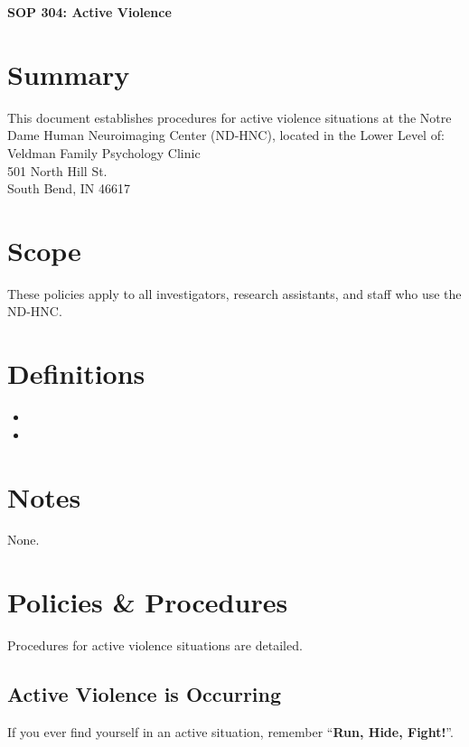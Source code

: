 \documentclass[11pt]{article}
\begin{document}
\renewcommand{\labelenumii}{\arabic{enumi}.\arabic{enumii}}
\renewcommand{\labelenumiii}{\arabic{enumi}.\arabic{enumii}.\arabic{enumiii}}
\renewcommand{\labelenumiv}{\arabic{enumi}.\arabic{enumii}.\arabic{enumiii}.\arabic{enumiv}}

\begin{center}
	\textbf{\Large SOP 304: Active Violence}\\
	\hrulefill
\end{center}


\section{Summary}
This document establishes  procedures for active violence situations at the Notre Dame Human Neuroimaging Center (ND-HNC), located in the Lower Level of:\\

Veldman Family Psychology Clinic\\
501 North Hill St.\\
South Bend, IN 46617

\section{Scope}
These policies apply to all investigators, research assistants, and staff who use the ND-HNC.

\section{Definitions}

\begin{itemize}
	\item \NDHNC
	\item \VFPC
\end{itemize}

\section{Notes}

None.


\section{Policies \& Procedures}

Procedures for active violence situations are detailed.


\subsection{Active Violence is Occurring}
\label{ssec:active-violence}
If you ever find yourself in an active situation, remember ``\textbf{Run, Hide, Fight!}''.
\end{document}
